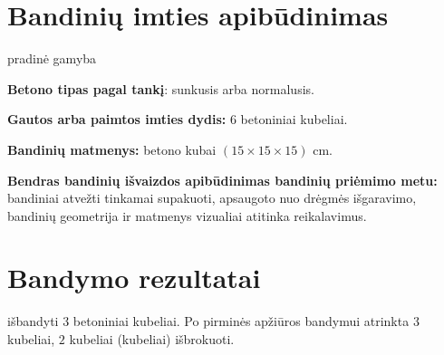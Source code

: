 \documentclass[a4paper, 12pt]{article}
\begin{document}
\section{Bandinių imties apibūdinimas}

\hspace{\parindent}{\bf Bandymo tipas pagal LST EN 206-1 8.2.1.2 ir/arba 8.2.1.3 pastraipas:} {pradinė gamyba }

{\bf Betono tipas pagal tankį}: {sunkusis arba normalusis}.%

{\bf Gautos arba paimtos imties dydis:} $ 6 $ betoniniai kubeliai. 
	
	{\bf Bandinių matmenys:} betono kubai { $ (15 \times 15 \times 15) $} cm.
	
	{\bf Bendras bandinių išvaizdos apibūdinimas bandinių priėmimo metu:} bandiniai atvežti tinkamai supakuoti, apsaugoto nuo drėgmės išgaravimo, bandinių geometrija ir matmenys vizualiai atitinka reikalavimus. %


\section{Bandymo rezultatai}

\hspace{\parindent}{\bf Išbandytos imties dydis:} išbandyti $ 3 $ betoniniai kubeliai.
Po pirminės apžiūros bandymui atrinkta $ 3 $ kubeliai,
$ 2 $ kubeliai (kubeliai) išbrokuoti. %
\end{document}
